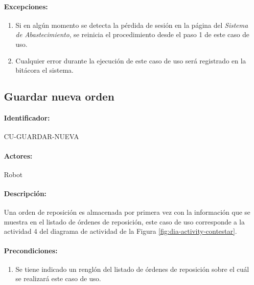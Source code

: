 \paragraph{Excepciones:}
\begin{enumerate}
  \item Si en algún momento se detecta la pérdida de sesión en la página del \textit{Sistema de Abastecimiento}, se reinicia el procedimiento desde el paso 1 de este caso de uso.
  \item Cualquier error durante la ejecución de este caso de uso será registrado en la bitácora el sistema.
\end{enumerate}


\subsection{Guardar nueva orden}\label{cu-guardar-nueva}
\paragraph{Identificador:}
CU-GUARDAR-NUEVA
\paragraph{Actores:}
Robot
\paragraph{Descripción:}
Una orden de reposición es almacenada por primera vez con la información que se muestra en el listado de órdenes de reposición, este caso de uso corresponde a la actividad 4 del diagrama de actividad de la Figura \ref{fig:dia-activity-contestar}.
\paragraph{Precondiciones:}
\begin{enumerate}
  \item Se tiene indicado un renglón del listado de órdenes de reposición sobre el cuál se realizará este caso de uso.
\end{enumerate}
